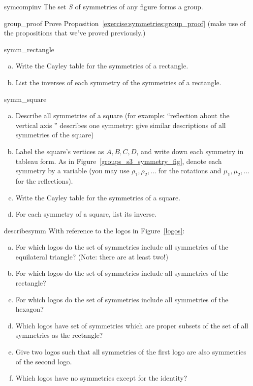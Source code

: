\begin{prop}{symcompinv}
The set $S$ of symmetries of any figure forms a group.
\end{prop}

\begin{exercise}{group_proof}
Prove Proposition~\ref{exercise:symmetries:group_proof} (make use of the propositions that we've proved previously.)
\end{exercise}

\bigskip
\begin{exercise}{symm_rectangle}
\begin{enumerate}[(a)]
\item
Write the Cayley table for the symmetries of a rectangle.
\item
List the inverses of each symmetry of the symmetries of a rectangle.
\end{enumerate}
\end{exercise}

\begin{exercise}{symm_square}
\begin{enumerate}[(a)]
\item
Describe all symmetries of a square  (for example: ``reflection about the vertical axis '' describes one symmetry: give similar descriptions of all symmetries of the square)
\item
Label the square's vertices as $A, B, C, D$, and write down each symmetry in tableau form. As in Figure~\ref{groups_s3_symmetry_fig}, denote each symmetry by a variable (you may use $\rho_1, \rho_2, \ldots$ for the rotations and $\mu_1, \mu_2, \ldots$ for the reflections).
\item
Write the Cayley table for the symmetries of a square.
\item
For each symmetry of a square, list its inverse.
\end{enumerate}
\end{exercise}

\begin{exercise}{describesymm}
With reference to the logos in Figure~\ref{logos}:
\begin{enumerate}[(a)]
\item
For which logos do the set of symmetries include all symmetries of the equilateral triangle? (Note: there are at least two!)
\item
For which logos do the set of symmetries include all symmetries of the rectangle?
\item
For which logos do the set of symmetries include all symmetries of the hexagon?
\item
Which logos have set of symmetries which are proper subsets of the set of all symmetries as the rectangle?
\item
Give two logos such that all symmetries of the first logo are also symmetries of the second logo.
\item
Which logos have no symmetries except for the identity?
\end{enumerate}
\end{exercise}  

